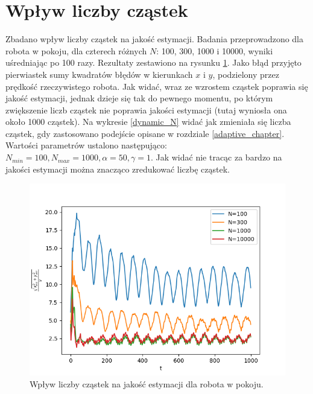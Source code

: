 \section{Wpływ liczby cząstek}
Zbadano wpływ liczby cząstek na jakość estymacji. Badania przeprowadzono dla  robota w pokoju, dla czterech różnych $N$: 100, 300, 1000 i 10000, wyniki uśredniając po 100 razy. Rezultaty zestawiono na rysunku \ref{wplyw_N}. Jako błąd przyjęto pierwiastek sumy kwadratów błędów w kierunkach $x$ i $y$, podzielony przez prędkość rzeczywistego robota. Jak widać, wraz ze wzrostem cząstek poprawia się jakość estymacji, jednak dzieje się tak do pewnego momentu, po którym zwiększenie liczb cząstek nie poprawia jakości estymacji (tutaj wyniosła ona około 1000 cząstek). Na wykresie \ref{dynamic_N} widać jak zmieniała się liczba cząstek, gdy zastosowano podejście opisane w rozdziale \ref{adaptive_chapter}. Wartości parametrów ustalono następująco: $N_{min}=100, N_{max}=1000, \alpha = 50, \gamma = 1$.  Jak widać nie tracąc za bardzo na jakości estymacji można znacząco zredukować liczbę cząstek.

\begin{figure}[H]
	\begin{center}
		\includegraphics[width=12cm]{./wplyw_N.png}
		\caption{Wpływ liczby cząstek na jakość estymacji dla robota w pokoju.}
		\label{wplyw_N}
	\end{center}
\end{figure}

